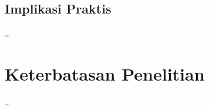 \subsection{Implikasi Praktis}
\label{subsec:bab5_implikasi}
\dots

\section{Keterbatasan Penelitian}
\label{subsec:bab5_keterbatasan}

\dots
